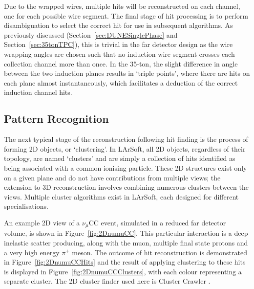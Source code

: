 Due to the wrapped wires, multiple hits will be reconstructed on each channel, one for each possible wire segment.  The final stage of hit processing is to perform disambiguation to select the correct hit for use in subsequent algorithms.  As previously discussed (Section~\ref{sec:DUNESinglePhase} and Section~\ref{sec:35tonTPC}), this is trivial in the far detector design as the wire wrapping angles are chosen such that no induction wire segment crosses each collection channel more than once.  In the 35-ton, the slight difference in angle between the two induction planes results in `triple points', where there are hits on each plane almost instantaneously, which facilitates a deduction of the correct induction channel hits.

\subsection{Pattern Recognition}\label{sec:PatternRecognition}

The next typical stage of the reconstruction following hit finding is the process of forming 2D objects, or `clustering'.  In LArSoft, all 2D objects, regardless of their topology, are named `clusters' and are simply a collection of hits identified as being associated with a common ionising particle.  These 2D structures exist only on a given plane and do not have contributions from multiple views; the extension to 3D reconstruction involves combining numerous clusters between the views.  Multiple cluster algorithms exist in LArSoft, each designed for different specialisations.

An example 2D view of a $\nu_{\mu}$CC event, simulated in a reduced far detector volume, is shown in Figure~\ref{fig:2DnumuCC}.  This particular interaction is a deep inelastic scatter producing, along with the muon, multiple final state protons and a very high energy $\pi^+$ meson.  The outcome of hit reconstruction is demonstrated in Figure~\ref{fig:2DnumuCCHits} and the result of applying clustering to these hits is displayed in Figure~\ref{fig:2DnumuCCClusters}, with each colour representing a separate cluster.  The 2D cluster finder used here is Cluster Crawler \cite{ClusterCrawler}.


